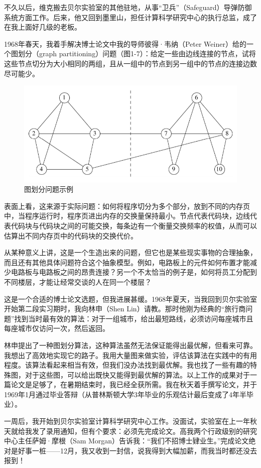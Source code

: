 \documentclass[a4paper,12pt,UTF8,twoside]{ctexbook}
\begin{document}
不久以后，维克搬去贝尔实验室的其他驻地，从事“卫兵”（Safeguard）导弹防御系统方面工作。后来，他又回到墨里山，担任计算科学研究中心的执行总监，成了在我上面好几级的老板。

1968年春天，我着手解决博士论文中我的导师彼得·韦纳（Peter Weiner）给的一个图划分（graph partitioning）问题（图1-7）：给定一些由边线连接的节点，试将这些节点切分为大小相同的两组，且从一组中的节点到另一组中的节点的连接边数尽可能少。

\begin{figure}[htbp]
	\centering
	\includegraphics[width=0.7\linewidth]{7}
	\caption{图划分问题示例}
	\label{fig:1}
\end{figure}

表面上看，这来源于实际问题：如何将程序切分为多个部分，放到不同的内存页中，当程序运行时，程序页进出内存的交换量保持最小。节点代表代码块，边线代表代码块与代码块之间的可能交换，每条边有一个衡量交换频率的权值，从而可以估算出不同内存页中的代码块的交换代价。

从某种意义上讲，这是一个生造出来的问题，但它也是某些现实事物的合理抽象，而且还有其他具体问题符合这个抽象模型。例如，电路板上的元件如何布置才能减少电路板与电路板之间的昂贵连接？另一个不太恰当的例子是，如何将员工分配到不同楼层，才能让经常交谈的人在同一个楼层？

这是一个合适的博士论文选题，但我进展甚缓。1968年夏天，当我回到贝尔实验室开始第二段实习期时，我向林申（Shen Lin）请教。那时他刚为经典的“旅行商问题”找到当时最有效的算法：对于一组城市，给出最短路线，必须访问每座城市且每座城市仅访问一次，然后返回。

林申提出了一种图划分算法，这种算法虽然无法保证能得出最优解，但看来可靠。我想出了高效地实现它的路子。我用大量图来做实验，评估该算法在实践中的有用程度。该算法看起来相当有效，但我们没办法找到最优解。我也找了一些有趣的特殊图，对于这些图，可以给出既快又能得到最优解的算法。以上工作的成果对于一篇论文是足够了，在暑期结束时，我已经全获所需。我在秋天着手撰写论文，并于1969年1月通过毕业答辩（从普林斯顿大学3年毕业的乐观估计最后变成了4年半毕业）。

一周后，我开始到贝尔实验室计算科学研究中心工作。没面试，实验室在上一年秋天就给我发了录用通知，但有个要求：必须先完成论文。高我两个行政级别的研究中心主任萨姆·摩根（Sam Morgan）告诉我：“我们不招博士肄业生。”完成论文绝对是好事一桩——12月，我又收到一封信，说我得到大幅加薪，而我当时都还没去报到！
\end{document}
